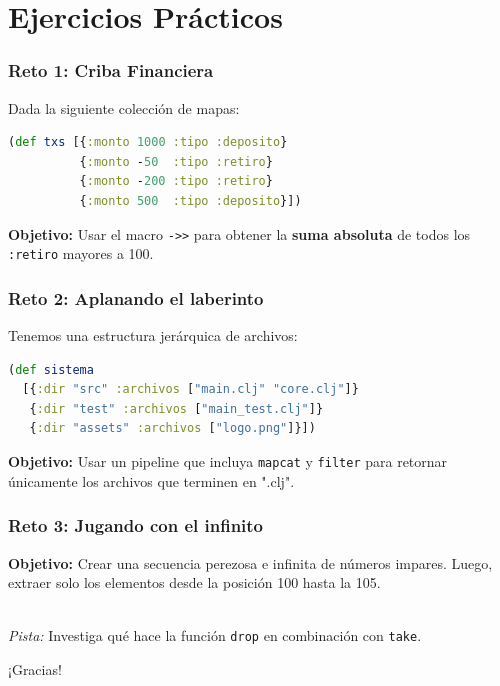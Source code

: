 \documentclass{beamer}
\begin{document}
\section{Ejercicios Prácticos}

\begin{frame}[fragile]
    \frametitle{Reto 1: Criba Financiera}
    Dada la siguiente colección de mapas:
    \begin{lstlisting}[language=Clojure]
(def txs [{:monto 1000 :tipo :deposito}
          {:monto -50  :tipo :retiro}
          {:monto -200 :tipo :retiro}
          {:monto 500  :tipo :deposito}])
    \end{lstlisting}
    \textbf{Objetivo:} Usar el macro \texttt{->>} para obtener la \textbf{suma absoluta} de todos los \texttt{:retiro} mayores a 100.
\end{frame}

\begin{frame}[fragile]
    \frametitle{Reto 2: Aplanando el laberinto}
    Tenemos una estructura jerárquica de archivos:
    \begin{lstlisting}[language=Clojure]
(def sistema
  [{:dir "src" :archivos ["main.clj" "core.clj"]}
   {:dir "test" :archivos ["main_test.clj"]}
   {:dir "assets" :archivos ["logo.png"]}])
    \end{lstlisting}
    \textbf{Objetivo:} Usar un pipeline que incluya \texttt{mapcat} y \texttt{filter} para retornar únicamente los archivos que terminen en ".clj".
\end{frame}

\begin{frame}[fragile]
    \frametitle{Reto 3: Jugando con el infinito}
    \textbf{Objetivo:} Crear una secuencia perezosa e infinita de números impares. Luego, extraer solo los elementos desde la posición 100 hasta la 105.
    \vspace{0.5cm}

    \\
    \textit{Pista:} Investiga qué hace la función \texttt{drop} en combinación con \texttt{take}.
\end{frame}

\begin{frame}
    \begin{center}
        \Huge ¡Gracias!
        \vspace{1cm}
    \end{center}
\end{frame}
\end{document}
